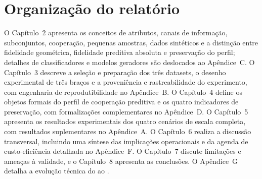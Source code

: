 \section{Organização do relatório}

O Capítulo~2 apresenta os conceitos de atributos, canais de informação, subconjuntos, cooperação, pequenas amostras, dados sintéticos e a distinção entre fidelidade geométrica, fidelidade preditiva absoluta e preservação do perfil; detalhes de classificadores e modelos geradores são deslocados ao Apêndice~C. O Capítulo~3 descreve a seleção e preparação dos três datasets, o desenho experimental de três braços e a proveniência e rastreabilidade do experimento, com engenharia de reprodutibilidade no Apêndice~B. O Capítulo~4 define os objetos formais do perfil de cooperação preditiva e os quatro indicadores de preservação, com formalizações complementares no Apêndice~D. O Capítulo~5 apresenta os resultados experimentais dos quatro cenários de escala completa, com resultados suplementares no Apêndice~A. O Capítulo~6 realiza a discussão transversal, incluindo uma síntese das implicações operacionais e da agenda de custo-eficiência detalhada no Apêndice~F. O Capítulo~7 discute limitações e ameaças à validade, e o Capítulo~8 apresenta as conclusões. O Apêndice~G detalha a evolução técnica do \SLACGS{} ao \CoInfoSim{}.

